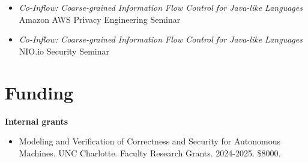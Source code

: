 \documentclass[11pt]{article}
\begin{document}
\begin{itemize}
\item \emph{Co-Inflow: Coarse-grained Information Flow Control for Java-like Languages} \\
  Amazon AWS Privacy Engineering Seminar
  

\item   \emph{Co-Inflow: Coarse-grained Information Flow Control for Java-like Languages} \\
  NIO.io Security Seminar 

\end{itemize}


\section{Funding}

\textbf{Internal grants}
\begin{itemize}
  \item Modeling and Verification of Correctness and Security for Autonomous Machines. UNC Charlotte. Faculty Research Grants. 2024-2025. \$8000. 
\end{itemize}



\end{document}
